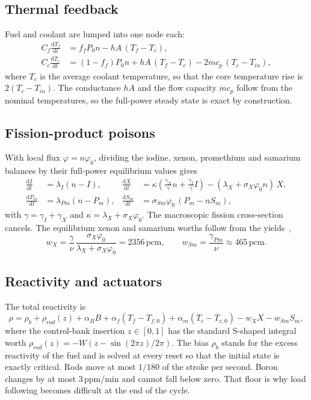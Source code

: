 \documentclass[11pt,a4paper]{article}
\newcommand{\pcm}{\ensuremath{\,\mathrm{pcm}}}
\newcommand{\dd}{\mathrm{d}}
\begin{document}
\subsection{Thermal feedback}

Fuel and coolant are lumped into one node each:
\begin{align}
  C_f \frac{\dd T_f}{\dd t} &= f_f P_0 n - hA\,(T_f - T_c), \\
  C_c \frac{\dd T_c}{\dd t} &= (1 - f_f) P_0 n + hA\,(T_f - T_c) - 2\dot m c_p\,(T_c - T_{in}),
\end{align}
where $T_c$ is the average coolant temperature, so that the core temperature rise is
$2(T_c - T_{in})$. The conductance $hA$ and the flow capacity $\dot m c_p$ follow from
the nominal temperatures, so the full-power steady state is exact by construction.

\subsection{Fission-product poisons}

With local flux $\varphi = n\varphi_0$, dividing the iodine, xenon, promethium and
samarium balances by their full-power equilibrium values gives
\begin{align}
  \frac{\dd I}{\dd t} &= \lambda_I (n - I), &
  \frac{\dd X}{\dd t} &= \kappa\left(\tfrac{\gamma_X}{\gamma} n + \tfrac{\gamma_I}{\gamma} I\right) - (\lambda_X + \sigma_X\varphi_0 n)\, X, \label{eq:xenon}\\
  \frac{\dd P_m}{\dd t} &= \lambda_{Pm} (n - P_m), &
  \frac{\dd S_m}{\dd t} &= \sigma_{Sm}\varphi_0\,(P_m - n S_m),
\end{align}
with $\gamma = \gamma_I + \gamma_X$ and $\kappa = \lambda_X + \sigma_X\varphi_0$. The
macroscopic fission cross-section cancels. The equilibrium xenon and samarium worths
follow from the yields~\cite{lamarsh2001},
\begin{equation}
  w_X = \frac{\gamma}{\nu}\,\frac{\sigma_X\varphi_0}{\lambda_X + \sigma_X\varphi_0} = 2356\pcm,
  \qquad
  w_{Sm} = \frac{\gamma_{Pm}}{\nu} \approx 465\pcm.
\end{equation}

\subsection{Reactivity and actuators}

The total reactivity is
\begin{equation}
  \rho = \rho_{b} + \rho_{rod}(z) + \alpha_B B + \alpha_f (T_f - T_{f,0}) + \alpha_m (T_c - T_{c,0}) - w_X X - w_{Sm} S_m,
  \label{eq:rho}
\end{equation}
where the control-bank insertion $z\in[0,1]$ has the standard S-shaped integral worth
$\rho_{rod}(z) = -W\left(z - \sin(2\pi z)/2\pi\right)$. The bias $\rho_b$ stands for the
excess reactivity of the fuel and is solved at every reset so that the initial state
is exactly critical. Rods move at most $1/180$ of the stroke per second. Boron
changes by at most $3$\,ppm/min and cannot fall below zero. That floor is why load
following becomes difficult at the end of the cycle.
\end{document}
